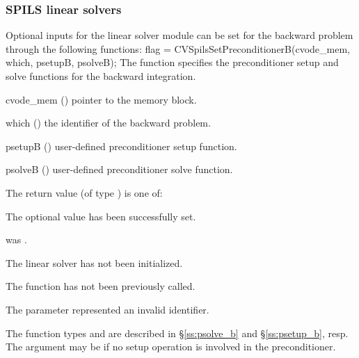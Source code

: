 \subsubsection{SPILS linear solvers}
Optional inputs for the {\cvspils} linear solver module can be set for the backward
problem through the following functions:
{
  flag = CVSpilsSetPreconditionerB(cvode\_mem, which, psetupB, psolveB);
}
{
  The function  specifies the preconditioner
  setup and solve functions for the backward integration.
}
{
  \begin{args}[psetupB]
  \item[cvode\_mem] ()
    pointer to the {\cvodes} memory block.
  \item[which] ()
    the identifier of the backward problem.
  \item[psetupB] ()
    user-defined preconditioner setup function.
  \item[psolveB] ()
    user-defined preconditioner solve function.
  \end{args}
}
{
  The return value  (of type ) is one of:
  \begin{args}
  \item[\Id{CVSPILS\_SUCCESS}] 
    The optional value has been successfully set.
  \item[\Id{CVSPILS\_MEM\_NULL}]
     was .
  \item[\Id{CVSPILS\_LMEM\_NULL}]
    The {\cvspils} linear solver has not been initialized.
  \item[\Id{CVSPILS\_NO\_ADJ}]
    The function  has not been previously called.
  \item[\Id{CVSPILS\_ILL\_INPUT}]
    The parameter  represented an invalid identifier.
  \end{args}
}
{
   The function types  and  are
   described in \S\ref{ss:psolve_b} and \S\ref{ss:psetup_b}, resp.
   The  argument may be  if no setup operation is involved
   in the preconditioner.
}
